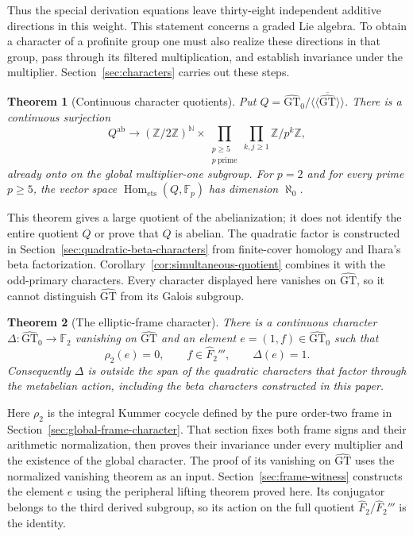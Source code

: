 \documentclass[11pt]{article}
\newcommand{\GT}{\widehat{\mathrm{GT}}}
\newcommand{\GTz}{\widehat{\mathrm{GT}}_0}
\newcommand{\F}{\mathbb F}
\newcommand{\Z}{\mathbb Z}
\newcommand{\Hom}{\operatorname{Hom}}
\newcommand{\cts}{\mathrm{cts}}
\newtheorem{theorem}{Theorem}[section]
\theoremstyle{definition}
\theoremstyle{remark}
\begin{document}
Thus the special derivation equations leave thirty-eight independent
additive directions in this weight.  This statement concerns a graded Lie
algebra.  To obtain a character of a profinite group one must also realize
these directions in that group, pass through its filtered multiplication,
and establish invariance under the multiplier.  Section~\ref{sec:characters}
carries out these steps.

\begin{theorem}[Continuous character quotients]\label{thm:main-character-quotients}
Put $Q=\GTz/\overline{\langle\!\langle\GT\rangle\!\rangle}$.
There is a continuous surjection
\[
 Q^{\mathrm{ab}}\longrightarrow
 (\Z/2\Z)^{\mathbb N}\times
 \prod_{\substack{p\geq5\\p\ \mathrm{prime}}}\prod_{k,j\geq1}\Z/p^k\Z,
\]
already onto on the global multiplier-one subgroup. For $p=2$ and
for every prime $p\geq5$, the vector space
$\Hom_{\cts}(Q,\F_p)$ has dimension $\aleph_0$.
\end{theorem}

This theorem gives a large quotient of the abelianization; it does not
identify the entire quotient $Q$ or prove that $Q$ is abelian.
The quadratic factor is constructed in
Section~\ref{sec:quadratic-beta-characters} from finite-cover homology
and Ihara's beta factorization. Corollary~\ref{cor:simultaneous-quotient}
combines it with the odd-primary characters. Every character displayed
here vanishes on $\GT$, so it cannot distinguish $\GT$ from its
Galois subgroup.

\begin{theorem}[The elliptic-frame character]\label{thm:frame-overview}
There is a continuous character $\Delta:\GTz\to\F_2$ vanishing
on $\GT$ and an element $e=(1,f)\in\GTz$ such that
\[
 \rho_2(e)=0,\qquad f\in\widehat F_2''',\qquad \Delta(e)=1.
\]
Consequently $\Delta$ is outside the span of the quadratic characters
that factor through the metabelian action, including the beta characters
constructed in this paper.
\end{theorem}

Here $\rho_2$ is the integral Kummer cocycle defined by the pure
order-two frame in Section~\ref{sec:global-frame-character}.
That section fixes both frame signs and their arithmetic normalization,
then proves their invariance under every multiplier and the existence
of the global character. The proof of its vanishing on $\GT$ uses
the normalized vanishing theorem \cite[Theorem~3]{H17} as an input.
Section~\ref{sec:frame-witness} constructs the element $e$ using the
peripheral lifting theorem proved here. Its conjugator belongs to the
third derived subgroup, so its action on the full quotient
$\widehat F_2/\widehat F_2'''$ is the identity.
\end{document}
